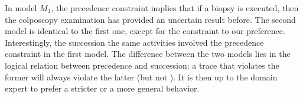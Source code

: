 In model $M_1$, the \textsf{precedence} constraint implies that if a biopsy is executed, then the colposcopy examination has provided an uncertain result before. The second model is identical to the first one, except for the constraint  %
to our preference. Interestingly, the \textsf{succession}  %
the same activities involved  %
the \textsf{precedence} constraint in the first model. The difference between the two models lies in the logical relation between \textsf{precedence} and \textsf{succession}: a trace that violates the former will always violate the latter (but not %
). It is then up to the domain expert to prefer a stricter or a more general behavior.



